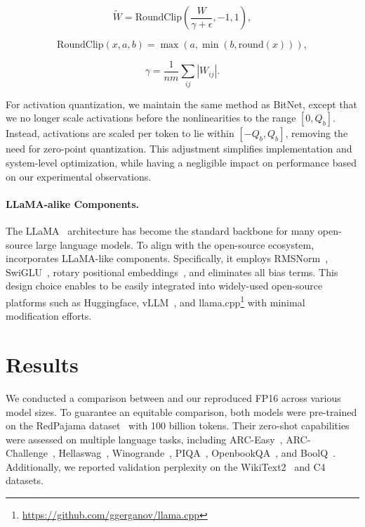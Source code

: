 \begin{equation}
    \widetilde{W} = \mathrm{RoundClip}(\frac{W}{\gamma + \epsilon}, -1, 1),
\end{equation}

\begin{equation}
    \mathrm{RoundClip}(x, a, b) = \max(a, \min(b, \mathrm{round}(x))),
\end{equation}

\begin{equation}
    \gamma = \frac{1}{nm}\sum_{ij} |W_{ij}|.
\end{equation}

For activation quantization, we maintain the same method as BitNet, except that we no longer scale activations before the nonlinearities to the range $[0, Q_b]$. Instead, activations are scaled per token to lie within $[-Q_b, Q_b]$, removing the need for zero-point quantization. This adjustment simplifies implementation and system-level optimization, while having a negligible impact on performance based on our experimental observations.

\paragraph{LLaMA-alike Components.}

The LLaMA~\cite{llama, llama2} architecture has become the standard backbone for many open-source large language models. To align with the open-source ecosystem,  incorporates LLaMA-like components. Specifically, it employs RMSNorm~\cite{rmsnorm}, SwiGLU~\cite{swiglu}, rotary positional embeddings~\cite{rope}, and eliminates all bias terms. This design choice enables  to be easily integrated into widely-used open-source platforms such as Huggingface, vLLM~\cite{vllm}, and llama.cpp\footnote{\url{https://github.com/ggerganov/llama.cpp}} with minimal modification efforts.

\section{Results}

We conducted a comparison between  and our reproduced FP16  across various model sizes. To guarantee an equitable comparison, both models were pre-trained on the RedPajama dataset~\cite{redpajama} with 100 billion tokens. Their zero-shot capabilities were assessed on multiple language tasks, including ARC-Easy~\cite{arc}, ARC-Challenge~\cite{arc}, Hellaswag~\cite{hellaswag}, Winogrande~\cite{winoGrande}, PIQA~\cite{piqa}, OpenbookQA~\cite{openbookqa}, and BoolQ~\cite{boolq}. Additionally, we reported validation perplexity on the WikiText2~\cite{wikitext2} and C4~\cite{c4} datasets.

